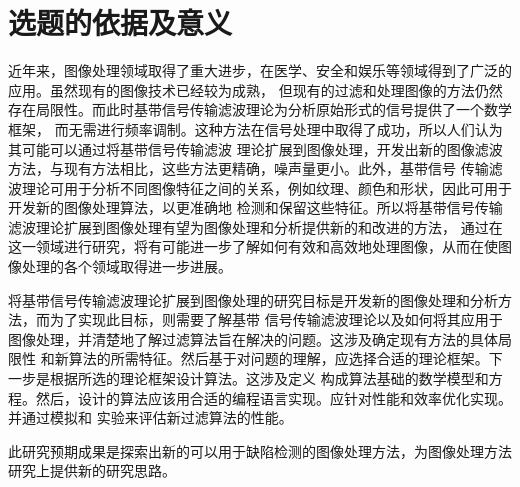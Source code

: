 %
%
%
%

\section{选题的依据及意义}

近年来，图像处理领域取得了重大进步，在医学、安全和娱乐等领域得到了广泛的应用。虽然现有的图像技术已经较为成熟，
但现有的过滤和处理图像的方法仍然存在局限性。而此时基带信号传输滤波理论为分析原始形式的信号提供了一个数学框架，
而无需进行频率调制。这种方法在信号处理中取得了成功，所以人们认为其可能可以通过将基带信号传输滤波
理论扩展到图像处理，开发出新的图像滤波方法，与现有方法相比，这些方法更精确，噪声量更小。此外，基带信号
传输滤波理论可用于分析不同图像特征之间的关系，例如纹理、颜色和形状，因此可用于开发新的图像处理算法，以更准确地
检测和保留这些特征。所以将基带信号传输滤波理论扩展到图像处理有望为图像处理和分析提供新的和改进的方法，
通过在这一领域进行研究，将有可能进一步了解如何有效和高效地处理图像，从而在使图像处理的各个领域取得进一步进展。

将基带信号传输滤波理论扩展到图像处理的研究目标是开发新的图像处理和分析方法，而为了实现此目标，则需要了解基带
信号传输滤波理论以及如何将其应用于图像处理，并清楚地了解过滤算法旨在解决的问题。这涉及确定现有方法的具体局限性
和新算法的所需特征。然后基于对问题的理解，应选择合适的理论框架。下一步是根据所选的理论框架设计算法。这涉及定义
构成算法基础的数学模型和方程。然后，设计的算法应该用合适的编程语言实现。应针对性能和效率优化实现。并通过模拟和
实验来评估新过滤算法的性能。

此研究预期成果是探索出新的可以用于缺陷检测的图像处理方法，为图像处理方法研究上提供新的研究思路。







